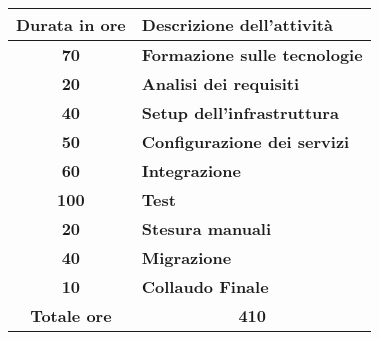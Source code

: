 \begin{tabularx}{\textwidth}{|c|X|}
	\hline
	\textbf{Durata in ore} & \textbf{Descrizione dell'attività} \\\hline
	\textbf{70}&\textbf{Formazione sulle tecnologie}\\\hline
	\textbf{20}&\textbf{Analisi dei requisiti}\\\hline
	\textbf{40}&\textbf{Setup dell'infrastruttura}\\\hline
	\textbf{50}&\textbf{Configurazione dei servizi}\\\hline
	\textbf{60}&\textbf{Integrazione}\\\hline
	\textbf{100}&\textbf{Test}\\\hline
	\textbf{20}&\textbf{Stesura manuali}\\\hline
	\textbf{40}&\textbf{Migrazione}\\\hline
	\textbf{10}&\textbf{Collaudo Finale}\\\hline
	\textbf{Totale ore}&\multicolumn{1}{c|}{\textbf{410}} \\\hline
	
\end{tabularx}

%	
%    
%    
%	
%	
%	
